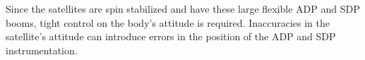 Since the satellites are spin stabilized and have these large flexible ADP and SDP booms, tight control on the body's attitude is required.  Inaccuracies in the satellite's attitude can introduce errors in the position of the ADP and SDP instrumentation.






